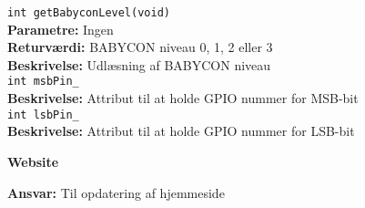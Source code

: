 \verb+int getBabyconLevel(void) +\\
\textbf{Parametre:}   Ingen \\
\textbf{Returværdi:}  BABYCON niveau 0, 1, 2 eller 3 \\
\textbf{Beskrivelse:} Udlæsning af BABYCON niveau \\

\verb+int msbPin_ +\\
\textbf{Beskrivelse:} Attribut til at holde GPIO nummer for MSB-bit \\

\verb+int lsbPin_ +\\
\textbf{Beskrivelse:} Attribut til at holde GPIO nummer for LSB-bit \\

{\centering
\textbf{Website}\par
}
\textbf{Ansvar:} Til opdatering af hjemmeside \